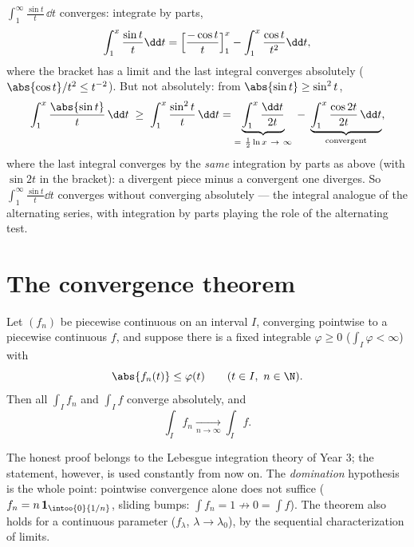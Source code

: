 \begin{example}\label{ex:b2:integration:sint}
$\displaystyle\int_1^{\infty} \frac{\sin t}{t}\,\dd t$ converges:
integrate by parts,
\[
\int_1^x \frac{\sin t}{t}\dd t
= \Bigl[\frac{-\cos t}{t}\Bigr]_1^x - \int_1^x \frac{\cos
t}{t^2}\dd t ,
\]
where the bracket has a limit and the last integral converges
absolutely ($\abs{\cos t}/t^2 \leq t^{-2}$). But not absolutely:
from $\abs{\sin t} \geq \sin^2 t$,
\[
\int_1^x \frac{\abs{\sin t}}{t}\,\dd t
\;\geq\; \int_1^x \frac{\sin^2t}{t}\,\dd t
= \underbrace{\int_1^x \frac{\dd t}{2t}}_{=\ \frac12\ln x
\ \to\ \infty}
\;-\; \underbrace{\int_1^x \frac{\cos 2t}{2t}\,\dd
t}_{\text{convergent}} ,
\]
where the last integral converges by the \emph{same}
integration by parts as above (with $\sin 2t$ in the bracket):
a divergent piece minus a convergent one diverges. So
$\int_1^\infty\frac{\sin t}{t}\dd t$ converges without
converging absolutely --- the integral analogue of the
alternating series, with integration by parts playing the role
of the alternating test.
\end{example}

\section{The convergence theorem}

\begin{theorem}\label{thm:b2:integration:dominated}
Let $(f_n)$ be piecewise continuous on an interval $I$, converging
pointwise to a piecewise continuous $f$, and suppose there is a
fixed integrable $\varphi \geq 0$ ($\int_I \varphi < \infty$)
with
\[
\abs{f_n(t)} \leq \varphi(t) \qquad (t \in I,\ n \in \N).
\]
Then all $\int_I f_n$ and $\int_I f$ converge absolutely, and
\[
\int_I f_n \xrightarrow[n \to \infty]{} \int_I f .
\]
\end{theorem}
\admitted

\begin{remark}
The honest proof belongs to the Lebesgue integration theory of Year
3; the statement, however, is used constantly from now on. The
\emph{domination} hypothesis is the whole point: pointwise
convergence alone does not suffice ($f_n = n\,\mathbf{1}_{\intoo{0}{1/n}}$,
sliding bumps: $\int f_n = 1 \not\to 0 = \int f$). The theorem
also holds for a continuous parameter ($f_\lambda$, $\lambda \to
\lambda_0$), by the sequential characterization of limits.
\end{remark}

